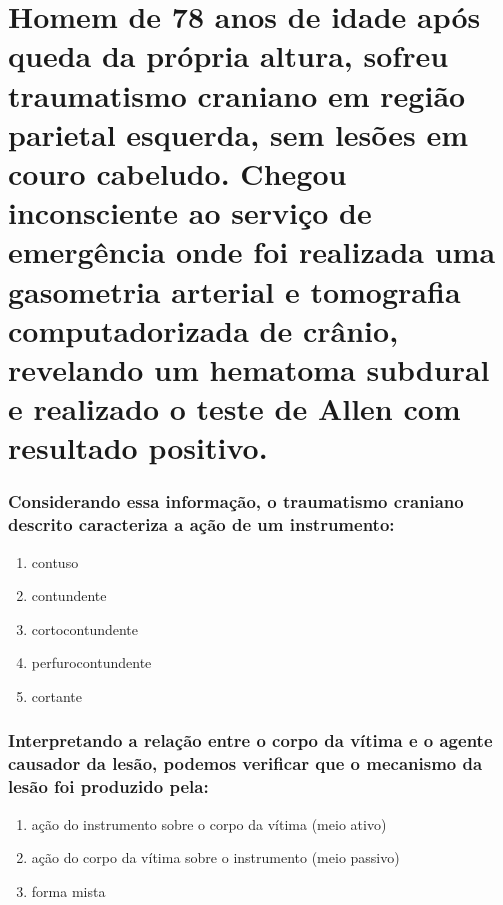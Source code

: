 \documentclass[11pt,notitlepage]{article}
\begin{document}
\part{Homem de 78 anos de idade após queda da própria altura, sofreu traumatismo craniano em região parietal esquerda, sem lesões em couro cabeludo. Chegou inconsciente ao serviço de emergência onde foi realizada uma gasometria arterial e tomografia computadorizada de crânio, revelando um hematoma subdural e realizado o teste de Allen com resultado positivo.}
\vspace{0.5cm}

\section{Considerando essa informação, o traumatismo craniano descrito caracteriza a ação de um instrumento:}
\begin{multicols}{2}
	\setlength{\columnseprule}{0pt}
	\begin{enumerate}[label=(\alph*)]
		\item contuso
		\item contundente
		\item cortocontundente
		\item perfurocontundente
		\item cortante
	\end{enumerate}
\end{multicols}
\vspace{0.5cm}

\section{Interpretando a relação entre o corpo da vítima e o agente causador da lesão, podemos verificar que o mecanismo da lesão foi produzido pela: }
\begin{multicols}{2}
	\setlength{\columnseprule}{0pt}
	\begin{enumerate}[label=(\alph*)]
		\item ação do instrumento sobre o corpo da vítima (meio ativo)
		\item ação do corpo da vítima sobre o instrumento (meio passivo)
		\item forma mista
	\end{enumerate}
\end{multicols}
\vspace{0.5cm}
\end{document}
